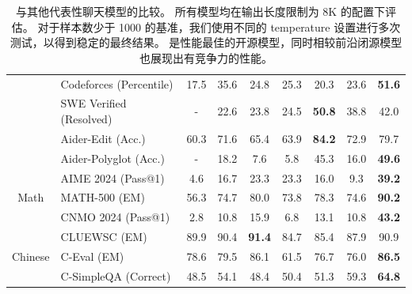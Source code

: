 \begin{table}[ht]
\begin{tabular}{@{}c l | c  c | c c c c| c@{}}
    & Codeforces {\tiny (Percentile)} & 17.5 & 35.6 & 24.8 & 25.3 & 20.3 & 23.6 & \textbf{51.6} \\
    & SWE Verified {\tiny (Resolved)} &-&22.6& 23.8 & 24.5 & \textbf{50.8}&38.8&42.0\\
    & Aider-Edit {\tiny (Acc.)} & 60.3& 71.6 & 65.4 & 63.9 & \textbf{84.2} &72.9&79.7 \\
    & Aider-Polyglot {\tiny (Acc.)}  & -& 18.2 & 7.6 & 5.8 & 45.3&16.0&\textbf{49.6} \\
    \midrule
    \multirow{3}{*}{Math} & AIME 2024 {\tiny (Pass@1)} & 4.6 & 16.7 & 23.3 & 23.3 & 16.0 & 9.3 & \textbf{39.2} \\
    & MATH-500 {\tiny (EM)} &  56.3 & 74.7 & 80.0 & 73.8 & 78.3 & 74.6&\textbf{90.2} \\
    & CNMO 2024 {\tiny (Pass@1)} & 2.8 & 10.8 & 15.9& 6.8& 13.1 & 10.8 &\textbf{43.2} \\
    \midrule
    \multirow{3}{*}{Chinese} & CLUEWSC {\tiny (EM)} & 89.9& 90.4 & \textbf{91.4} & 84.7 & 85.4 & 87.9 & 90.9\\
    & C-Eval {\tiny (EM)} & 78.6& 79.5 & 86.1 & 61.5 & 76.7 & 76.0 & \textbf{86.5}\\
     & C-SimpleQA {\tiny (Correct)}  & 48.5& 54.1 & 48.4 & 50.4 & 51.3 & 59.3 & \textbf{64.8}\\
    \bottomrule
    \end{tabular}
    \caption{
        \dsviii{} 与其他代表性聊天模型的比较。
        所有模型均在输出长度限制为 8K 的配置下评估。
        对于样本数少于 1000 的基准，我们使用不同的 temperature 设置进行多次测试，以得到稳定的最终结果。
        \dsviii{} 是性能最佳的开源模型，同时相较前沿闭源模型也展现出有竞争力的性能。
    }
    \label{tab:chat}
\end{table}
